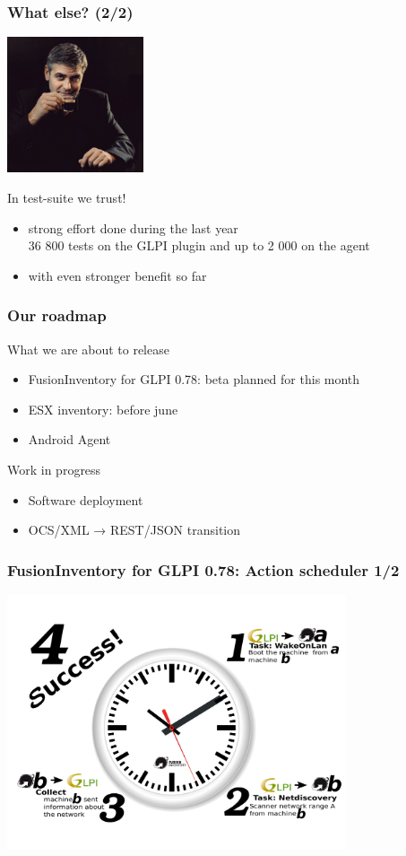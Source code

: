 \documentclass{beamer}
\begin{document}
\begin{frame}
    \frametitle{What else? (2/2)}

    \begin{center}
    \includegraphics[height=4.0cm]{pics/whatelse.jpg}
    \end{center}

    \begin{block}{In test-suite we trust!}
        \begin{itemize}
            \item strong effort done during the last year \\
            \small{36 800 tests on the GLPI plugin and up to 2 000 on the agent}
            \item with even stronger benefit so far
        \end{itemize}
    \end{block}
\end{frame}

\begin{frame}
    \frametitle{Our roadmap}

    What we are about to release
    \begin{itemize}
    \item FusionInventory for GLPI 0.78: beta planned for this month
    \item ESX inventory: before june
    \item Android Agent
    \end{itemize}

    Work in progress
    \begin{itemize}
    \item Software deployment
    \item OCS/XML → REST/JSON transition
    \end{itemize}
\end{frame}

\begin{frame}
\frametitle{FusionInventory for GLPI 0.78: Action scheduler 1/2}
    \includegraphics[height=7.5cm]{pics/fusion_task.pdf}
\end{frame}
\end{document}
